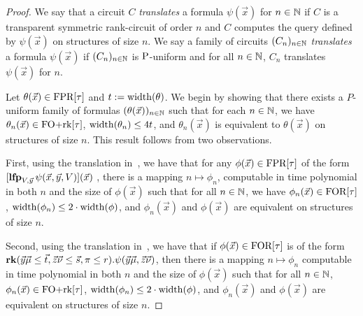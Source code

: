 \documentclass[../paper.tex]{subfiles}
\begin{document}
\begin{proof}
  We say that a circuit $C$ \emph{translates} a formula $\psi(\vec{x})$ for $n
  \in \mathbb{N}$ if $C$ is a transparent symmetric rank-circuit of order $n$ and $C$
  computes the query defined by $\psi(\vec{x})$ on structures of size $n$. We
  say a family of circuits $(C_n)_{n \in \mathbb{N}}$ \emph{translates} a formula
  $\psi (\vec{x})$ if $(C_n)_{n \in \mathbb{N}}$ is $\mathrm{P}$-uniform and for all $n \in
  \mathbb{N}$, $C_n$ translates $\psi(\vec{x})$ for $n$.

  
  Let $\theta(\vec{x}) \in \text{\upshape FPR}[\tau]$ and $t := \mathrm{width} (\theta)$. We begin by
  showing that there exists a $P$-uniform family of formulas
  $(\theta(\vec{x}))_{n \in \mathbb{N}}$ such that for each $n \in \mathbb{N}$, we have
  $\theta_n(\vec{x}) \in \text{\upshape FO+rk}[\tau]$, $\mathrm{width}(\theta_n) \leq 4 t$, and
  $\theta_n(\vec{x})$ is equivalent to $\theta(\vec{x})$ on structures of size
  $n$. This result follows from two observations.

  First, using the translation in~\cite{Dawar09logicswith}, we have that for any
  $\phi(\vec{x}) \in \text{\upshape FPR}[\tau]$ of the form $[\text{\textbf{lfp}}_{V, \vec{y}} \, \psi(\vec{x},
    \vec{y}, V) ](\vec{x})$ , there is a mapping $n \mapsto \phi_n$, computable
  in time polynomial in both $n$ and the size of $\phi(\vec{x})$ such that for
  all $n \in \mathbb{N}$, we have $\phi_n(\vec{x}) \in \text{\upshape FOR}[\tau]$, $\mathrm{width} (\phi_n)
  \leq 2 \cdot \mathrm{width} (\phi)$, and $\phi_n(\vec{x})$ and $\phi(\vec{x})$ are
  equivalent on structures of size $n$.

  Second, using the translation in~\cite{libkin2004elements}, we have that if
  $\phi (\vec{x}) \in \text{\upshape FOR}[\tau]$ is of the form $\text{\textbf{rk}} (\vec{y}\vec{\mu} \leq
  \vec{t}, \vec{z}\vec{\nu} \leq \vec{s}, \pi \leq r) . \psi (\vec{y}\vec{\mu},
  \vec{z} \vec{\nu})$, then there is a mapping $n \mapsto \phi_n$ computable in
  time polynomial in both $n$ and the size of $\phi(\vec{x})$ such that for all
  $n \in \mathbb{N}$, $\phi_n(\vec{x}) \in \text{\upshape FO+rk}[\tau]$, $\mathrm{width}(\phi_n) \leq 2 \cdot
  \mathrm{width}(\phi)$, and $\phi_n(\vec{x})$ and $\phi(\vec{x})$ are equivalent on
  structures of size $n$.


\end{proof}
\end{document}
